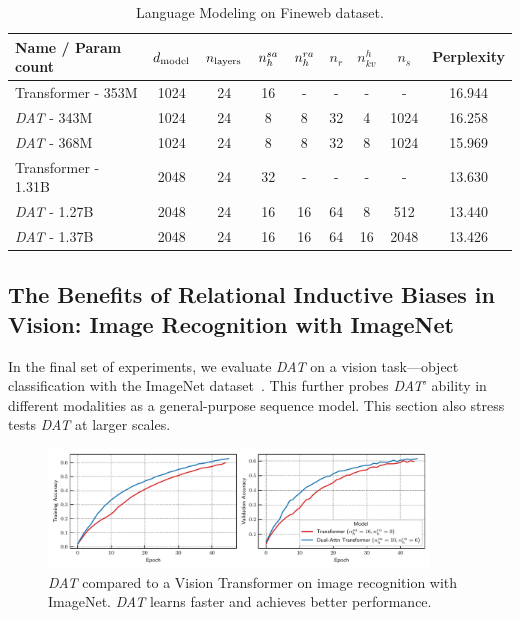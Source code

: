 \begin{table}[]
    \centering
    \caption{Language Modeling on Fineweb dataset.}\label{tab:my-table}
    \begin{tabular}{@{}l|ccccccc|c@{}}
    \toprule
    Name / Param count   &$d_{\mathrm{model}}$&$n_{\mathrm{layers}}$& $n_h^{sa}$  & $n_h^{ra}$ & $n_r$ & $n_{kv}^{h}$ & $n_s$ & Perplexity \\ \midrule\hline
    Transformer - 353M   & 1024    & 24       & 16       & -        & -     & -        & -     & 16.944     \\
    \textit{DAT} - 343M  & 1024    & 24       & 8        & 8        & 32    & 4        & 1024  & 16.258     \\
    \textit{DAT} - 368M  & 1024    & 24       & 8        & 8        & 32    & 8        & 1024  & 15.969     \\\midrule
    Transformer - 1.31B  & 2048    & 24       & 32       & -        & -     & -        & -     & 13.630     \\
    \textit{DAT} - 1.27B & 2048    & 24       & 16       & 16       & 64    & 8        & 512   & 13.440     \\
    \textit{DAT} - 1.37B & 2048    & 24       & 16       & 16       & 64    & 16       & 2048  & 13.426     \\ \bottomrule
    \end{tabular}%
\end{table}


\subsection{The Benefits of Relational Inductive Biases in Vision: Image Recognition with ImageNet}\label{ssec:imagenet}

In the final set of experiments, we evaluate \textit{DAT} on a vision task---object classification with the ImageNet dataset~\citep{imagenet}. This further probes \textit{DAT}' ability in different modalities as a general-purpose sequence model. This section also stress tests \textit{DAT} at larger scales.

\begin{figure}[ht]
    \centering
    \includegraphics[width=0.9\textwidth]{figs/experiments/imagenet/imagenet_acc_curves.pdf}
    \caption{\textit{DAT} compared to a Vision Transformer on image recognition with ImageNet. \textit{DAT} learns faster and achieves better performance.}\label{fig:vision_acc_curve}
\end{figure}

